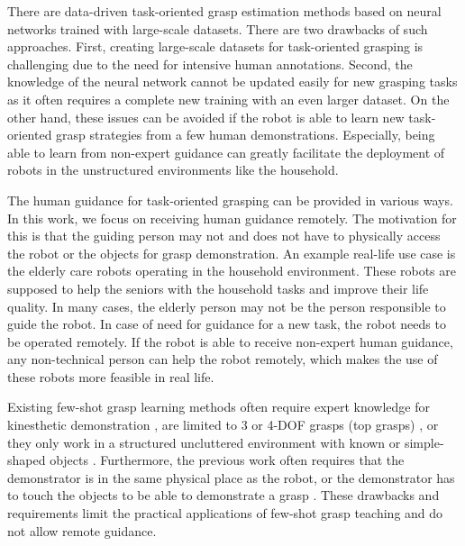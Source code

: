 \documentclass[letterpaper]{article} %
\begin{document}
There are data-driven task-oriented grasp estimation methods based on neural networks trained with large-scale datasets. There are two drawbacks of such approaches. First, creating large-scale datasets for task-oriented grasping is challenging due to the need for intensive human annotations. 
Second, the knowledge of the neural network cannot be updated easily for new grasping tasks as it often requires a complete new training with an even larger dataset. On the other hand, these issues can be avoided if the robot is able to learn new task-oriented grasp strategies from a few human demonstrations. Especially, being able to learn from non-expert guidance can greatly facilitate the deployment of robots in the unstructured environments like the household. 

The human guidance for task-oriented grasping can be provided in various ways. In this work, we focus on receiving human guidance remotely. The motivation for this is that the guiding person may not and does not have to physically access the robot or the objects for grasp demonstration. An example real-life use case is the elderly care robots operating in the household environment. These robots are supposed to help the seniors with the household tasks and improve their life quality. In many cases, the elderly person may not be the person responsible to guide the robot. In case of need for guidance for a new task, the robot needs to be operated remotely. If the robot is able to receive non-expert human guidance, any non-technical person can help the robot remotely, which makes the use of these robots more feasible in real life.

Existing few-shot grasp learning methods often require expert knowledge for kinesthetic demonstration \cite{kopicki2016one}, are limited to 3 or 4-DOF grasps (top grasps) \cite{van2018learning,yang2021attribute, guo2022few}, or they only work in a structured uncluttered environment with known or simple-shaped objects \cite{van2018learning}. Furthermore, the previous work often requires that the demonstrator is in the same physical place as the robot, or the demonstrator has to touch the objects to be able to demonstrate a grasp \cite{helenon2020learning, wang2021demograsp,saito2022task}. These drawbacks and requirements limit the practical applications of few-shot grasp teaching and do not allow remote guidance.
\end{document}
